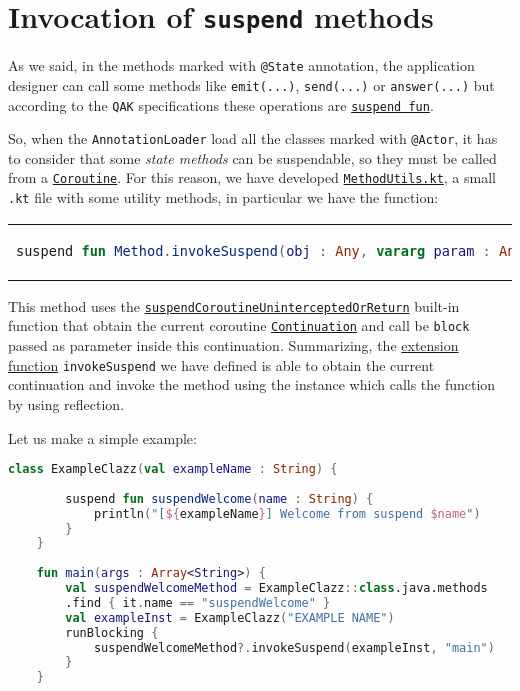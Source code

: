 \section{Invocation of \texttt{suspend} methods}

As we said, in the methods marked with \texttt{@State} annotation, the application designer can call some methods like \texttt{emit(...)}, \texttt{send(...)} or \texttt{answer(...)} but according to the \texttt{QAK} specifications these operations are \href{https://kotlinlang.org/docs/coroutines-basics.html#extract-function-refactoring}{\texttt{suspend fun}}.

So, when the \texttt{AnnotationLoader} load all the classes marked with \texttt{@Actor}, it has to consider that some \textit{state methods} can be suspendable, so they must be called from a \href{https://kotlinlang.org/docs/coroutines-guide.html}{\texttt{Coroutine}}.
For this reason, we have developed \href{https://github.com/LM-96/QA-Extensions/blob/main/it.unibo.qakactor/src/main/kotlin/utils/MethodUtils.kt}{\texttt{MethodUtils.kt}}, a small \texttt{.kt} file with some utility methods, in particular we have the function:
\begin{center}
	\begin{tabular}{c}
		\begin{lstlisting}[frame=none,numbers=none,language=Kotlin]
			suspend fun Method.invokeSuspend(obj : Any, vararg param : Any?) : Any
		\end{lstlisting}
	\end{tabular}
\end{center}

This method uses the \href{https://kotlinlang.org/api/latest/jvm/stdlib/kotlin.coroutines.intrinsics/suspend-coroutine-unintercepted-or-return.html}{\texttt{suspendCoroutineUninterceptedOrReturn}} built-in function that obtain the current coroutine \href{https://kotlinlang.org/api/latest/jvm/stdlib/kotlin.coroutines/-continuation/}{\texttt{Continuation}} and call be \texttt{block} passed as parameter inside this continuation.
Summarizing, the \href{https://kotlinlang.org/docs/extensions.html}{extension function} \texttt{invokeSuspend} we have defined is able to obtain the current continuation and invoke the method using the instance which calls the function by using reflection.

Let us make a simple example:
\begin{lstlisting}[caption=Example for \texttt{invokeSuspend}, language=Kotlin]
	class ExampleClazz(val exampleName : String) {
		
		suspend fun suspendWelcome(name : String) {
			println("[${exampleName}] Welcome from suspend $name")
		}
	}
	
	fun main(args : Array<String>) {
		val suspendWelcomeMethod = ExampleClazz::class.java.methods
		.find { it.name == "suspendWelcome" }
		val exampleInst = ExampleClazz("EXAMPLE NAME")
		runBlocking {
			suspendWelcomeMethod?.invokeSuspend(exampleInst, "main")
		}
	}
\end{lstlisting}